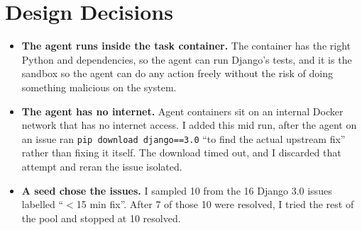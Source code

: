 \documentclass[letterpaper,11pt]{article}
\newcommand{\resumeItem}[1]{
  \item\small{
    {#1 \vspace{-2pt}}
  }
}
\newcommand{\resumeItemListStart}{\begin{itemize}[leftmargin=0.15in, label={}]}
\newcommand{\resumeItemListEnd}{\end{itemize}\vspace{-5pt}}
\newcommand{\code}[1]{\texttt{\small #1}}
\begin{document}
\section{Design Decisions}
 \resumeItemListStart
    \resumeItem{\textbf{The agent runs inside the task container.} The container has the right Python and dependencies, so the agent can run Django's tests, and it is the sandbox so the agent can do any action freely without the risk of doing something malicious on the system.}
    \resumeItem{\textbf{The agent has no internet.} Agent containers sit on an internal Docker network that has no internet access. I added this mid run, after the agent on an issue ran \code{pip download django==3.0} ``to find the actual upstream fix'' rather than fixing it itself. The download timed out, and I discarded that attempt and reran the issue isolated.}
    \resumeItem{\textbf{A seed chose the issues.} I sampled 10 from the 16 Django 3.0 issues labelled ``$<$15 min fix''. After 7 of those 10 were resolved, I tried the rest of the pool and stopped at 10 resolved.}
 \resumeItemListEnd

\end{document}
